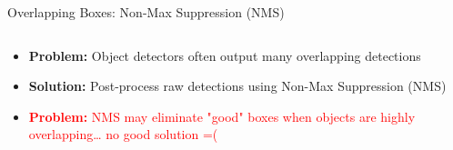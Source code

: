 \begin{frame}{Overlapping Boxes: Non-Max Suppression (NMS)}
\begin{columns}
    \begin{column}{0.5\textwidth}
    \begin{itemize}
        \item<1-> \textbf{Problem:} Object detectors often output many overlapping detections
        \item<2-> \textbf{Solution:} Post-process raw detections using Non-Max Suppression (NMS)
        \item<5-> \textcolor{red}{\textbf{Problem:} NMS may eliminate "good" boxes when objects are highly overlapping… no good solution =( }
    \end{itemize}
    \end{column}
    
    \begin{column}{0.5\textwidth}


\end{column}
\end{columns}
\end{frame}
